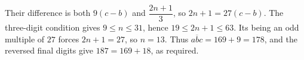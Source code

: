Their difference is both $9(c-b)$ and $\dfrac{2n+1}{3}$, so $2n+1=27(c-b)$. The three-digit condition gives $9\le n\le31$, hence $19\le2n+1\le63$. Its being an odd multiple of $27$ forces $2n+1=27$, so $n=13$. Thus $\overline{abc}=169+9=\boxed{178}$, and the reversed final digits give $187=169+18$, as required.
